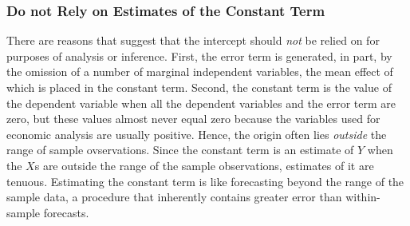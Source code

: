 \documentclass[11pt]{article}
\begin{document}
\subsubsection{Do not Rely on Estimates of the Constant Term}

There are reasons that suggest that the intercept should \textit{not} be relied on for purposes of analysis or inference. First, the error term is generated, in part, by the omission of a number of marginal independent variables, the mean effect of which is placed in the constant term. Second, the constant term is the value of the dependent variable when all the dependent variables and the error term are zero, but these values almost never equal zero because the variables used for economic analysis are usually positive. Hence, the origin often lies \textit{outside} the range of sample ovservations. Since the constant term is an estimate of $Y$ when the $X$s are outside the range of the sample observations, estimates of it are tenuous. Estimating the constant term is like forecasting beyond the range of the sample data, a procedure that inherently contains greater error than within-sample forecasts.
\end{document}
